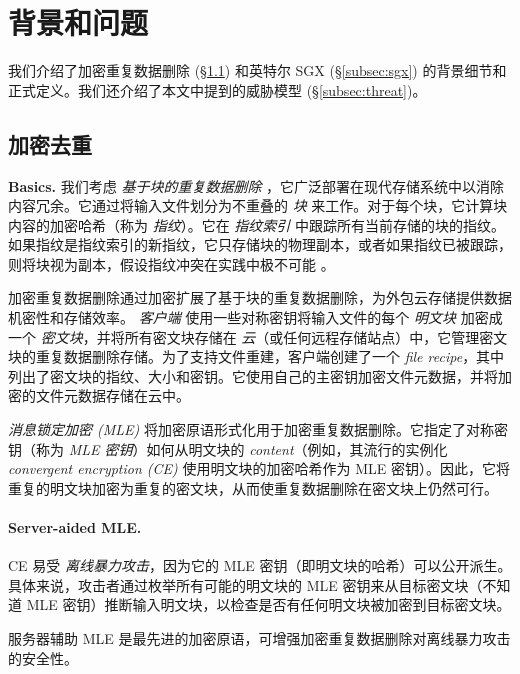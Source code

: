 \section{背景和问题}
\label{sec:background}

我们介绍了加密重复数据删除 (\S\ref{subsec:encrypted-dedup}) 和英特尔 SGX (\S\ref{subsec:sgx}) 的背景细节和正式定义。我们还介绍了本文中提到的威胁模型 (\S\ref{subsec:threat})。

\subsection{加密去重}
\label{subsec:encrypted-dedup}

\noindent
{\bf Basics.} 我们考虑 {\em 基于块的重复数据删除} \cite{zhu08,wallace12,meyer11}，它广泛部署在现代存储系统中以消除内容冗余。它通过将输入文件划分为不重叠的 {\em 块} 来工作。对于每个块，它计算块内容的加密哈希（称为 {\em 指纹}）。它在 {\em 指纹索引} 中跟踪所有当前存储的块的指纹。如果指纹是指纹索引的新指纹，它只存储块的物理副本，或者如果指纹已被跟踪，则将块视为副本，假设指纹冲突在实践中极不可能 \cite{black06}。
   
加密重复数据删除通过加密扩展了基于块的重复数据删除，为外包云存储提供数据机密性和存储效率。 {\em 客户端} 使用一些对称密钥将输入文件的每个 {\em 明文块} 加密成一个 {\em 密文块}，并将所有密文块存储在 {\em 云}（或任何远程存储站点）中，它管理密文块的重复数据删除存储。为了支持文件重建，客户端创建了一个 {\em file recipe}，其中列出了密文块的指纹、大小和密钥。它使用自己的主密钥加密文件元数据，并将加密的文件元数据存储在云中。

{\em 消息锁定加密 (MLE)} \cite{bellare13a} 将加密原语形式化用于加密重复数据删除。它指定了对称密钥（称为 {\em MLE 密钥}）如何从明文块的 {\em content}（例如，其流行的实例化 {\em convergent encryption (CE)} \cite{douceur02}使用明文块的加密哈希作为 MLE 密钥）。因此，它将重复的明文块加密为重复的密文块，从而使重复数据删除在密文块上仍然可行。

\paragraph{Server-aided MLE.} CE 易受 {\em 离线暴力攻击}，因为它的 MLE 密钥（即明文块的哈希）可以公开派生。具体来说，攻击者通过枚举所有可能的明文块的 MLE 密钥来从目标密文块（不知道 MLE 密钥）推断输入明文块，以检查是否有任何明文块被加密到目标密文块。

服务器辅助 MLE \cite{bellare13b} 是最先进的加密原语，可增强加密重复数据删除对离线暴力攻击的安全性。

